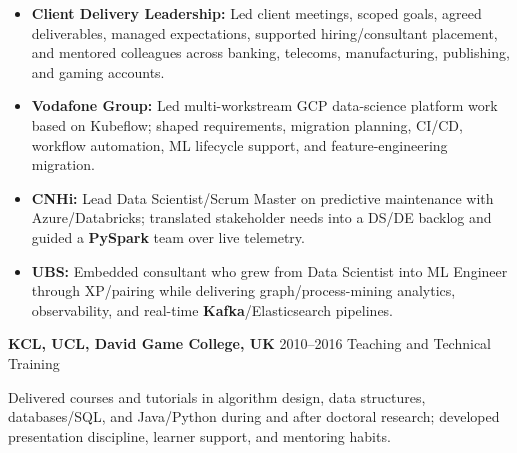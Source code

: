 \documentclass[]{../../../../friggeri-cv}
\renewcommand{\entry}[4]{%
  \parbox[t]{\dimexpr\textwidth-\entryleftinset\relax}{%
    \textbf{#2}%
    {\footnotesize\addfontfeature{Color=lightgray}\hspace{0.6em}#1}%
    \hfill%
    {\small\color{textcolor} #3}\\%
    #4\vspace{\parsep}%
  }\\}
\begin{document}
\begin{entrylist}
{{        }
        \begin{itemize}[leftmargin=1.1em]
            \item \footnotesize\textbf{Client Delivery Leadership:} Led client meetings, scoped goals, agreed deliverables, managed expectations, supported hiring/consultant placement, and mentored colleagues across banking, telecoms, manufacturing, publishing, and gaming accounts.
            \item \footnotesize\textbf{Vodafone Group:} Led multi-workstream GCP data-science platform work based on Kubeflow; shaped requirements, migration planning, CI/CD, workflow automation, ML lifecycle support, and feature-engineering migration.
            \item \footnotesize\textbf{CNHi:} Lead Data Scientist/Scrum Master on predictive maintenance with Azure/Databricks; translated stakeholder needs into a DS/DE backlog and guided a \textbf{PySpark} team over live telemetry.
            \item \footnotesize\textbf{UBS:} Embedded consultant who grew from Data Scientist into ML Engineer through XP/pairing while delivering graph/process-mining analytics, observability, and real-time \textbf{Kafka}/Elasticsearch pipelines.
        \end{itemize}
    }
    \entry
    {2010--2016}
    {KCL, UCL, David Game College, UK}
    {Teaching and Technical Training}
    {
        {\small
        \setlength{\parindent}{0pt}
        \setlength{\leftskip}{0pt}
        Delivered courses and tutorials in algorithm design, data structures, databases/SQL, and Java/Python during and after doctoral research; developed presentation discipline, learner support, and mentoring habits.

        }
    }
\end{entrylist}
\newpage
\setlength{\parskip}{2pt}
\setlength{\parsep}{0pt}
\end{document}
